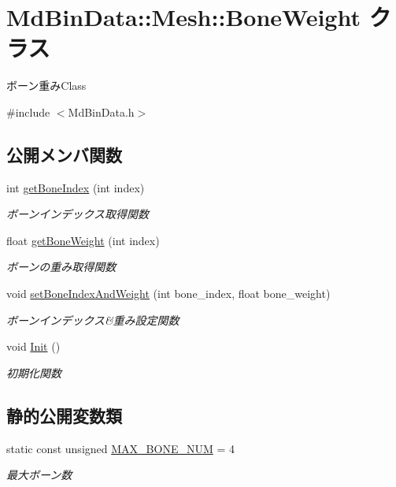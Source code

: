 \hypertarget{class_md_bin_data_1_1_mesh_1_1_bone_weight}{}\section{Md\+Bin\+Data\+:\+:Mesh\+:\+:Bone\+Weight クラス}
\label{class_md_bin_data_1_1_mesh_1_1_bone_weight}


ボーン重み\+Class  




{\ttfamily \#include $<$Md\+Bin\+Data.\+h$>$}

\subsection*{公開メンバ関数}
\begin{DoxyCompactItemize}
\item 
int \mbox{\hyperlink{class_md_bin_data_1_1_mesh_1_1_bone_weight_a0e88a654cd1a709780357cb5c612070e}{get\+Bone\+Index}} (int index)
\begin{DoxyCompactList}\small\item\em ボーンインデックス取得関数 \end{DoxyCompactList}\item 
float \mbox{\hyperlink{class_md_bin_data_1_1_mesh_1_1_bone_weight_a3beb8b0ee437d812fe8c0cccd6acb194}{get\+Bone\+Weight}} (int index)
\begin{DoxyCompactList}\small\item\em ボーンの重み取得関数 \end{DoxyCompactList}\item 
void \mbox{\hyperlink{class_md_bin_data_1_1_mesh_1_1_bone_weight_a219857a3874c416784d461366e867d57}{set\+Bone\+Index\+And\+Weight}} (int bone\+\_\+index, float bone\+\_\+weight)
\begin{DoxyCompactList}\small\item\em ボーンインデックス\&重み設定関数 \end{DoxyCompactList}\item 
void \mbox{\hyperlink{class_md_bin_data_1_1_mesh_1_1_bone_weight_a01430f0a589f6276dffeab831c573708}{Init}} ()
\begin{DoxyCompactList}\small\item\em 初期化関数 \end{DoxyCompactList}\end{DoxyCompactItemize}
\subsection*{静的公開変数類}
\begin{DoxyCompactItemize}
\item 
static const unsigned \mbox{\hyperlink{class_md_bin_data_1_1_mesh_1_1_bone_weight_a2c870f6c96315b6b9630cff3c24b79e7}{M\+A\+X\+\_\+\+B\+O\+N\+E\+\_\+\+N\+UM}} = 4
\begin{DoxyCompactList}\small\item\em 最大ボーン数 \end{DoxyCompactList}\end{DoxyCompactItemize}
